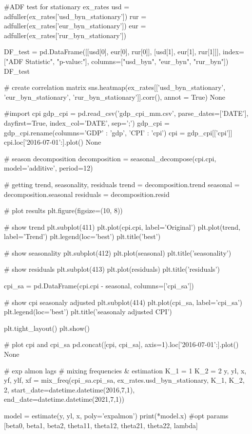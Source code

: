 \documentclass[a4paper, 12pt]{extarticle}
\begin{document}
\begin{python}
	#ADF test for stationary ex_rates
	usd = adfuller(ex_rates['usd_byn_stationary'])
	rur = adfuller(ex_rates['eur_byn_stationary'])
	eur = adfuller(ex_rates['rur_byn_stationary'])
	
	DF_test = pd.DataFrame([[usd[0], eur[0], rur[0]], [usd[1], eur[1], rur[1]]], index=["ADF Statistic", "p-value:"], columns=["usd_byn", "eur_byn", "rur_byn"])
	DF_test
		
	# create correlation matrix
	sns.heatmap(ex_rates[['usd_byn_stationary', 'eur_byn_stationary', 'rur_byn_stationary']].corr(), annot = True)
	None
	
	#import cpi
	gdp_cpi = pd.read_csv('gdp_cpi_mm.csv', parse_dates=['DATE'], dayfirst=True, index_col='DATE', sep=';')
	gdp_cpi = gdp_cpi.rename(columns={'GDP' : 'gdp', 'CPI' : 'cpi'})
	cpi = gdp_cpi[['cpi']]
	cpi.loc['2016-07-01':].plot()
	None
	
	# season decomposition
	decomposition = seasonal_decompose(cpi.cpi, model='additive', period=12)
	
	# getting trend, seasonality, residuals
	trend = decomposition.trend
	seasonal = decomposition.seasonal
	residuals = decomposition.resid
	
	# plot results
	plt.figure(figsize=(10, 8))
	
	# show trend
	plt.subplot(411)
	plt.plot(cpi.cpi, label='Original')
	plt.plot(trend, label='Trend')
	plt.legend(loc='best')
	plt.title('best')
	
	# show seasonality
	plt.subplot(412)
	plt.plot(seasonal)
	plt.title('seasonality')
	
	# show residuals
	plt.subplot(413)
	plt.plot(residuals)
	plt.title('residuals')
	
	cpi_sa = pd.DataFrame(cpi.cpi - seasonal, columns=['cpi_sa'])
	
	# show cpi seasonaly adjusted
	plt.subplot(414)
	plt.plot(cpi_sa, label='cpi_sa')
	plt.legend(loc='best')
	plt.title('seasonaly adjusted CPI')
	
	plt.tight_layout()
	plt.show()
	
	# plot cpi and cpi_sa
	pd.concat([cpi, cpi_sa], axis=1).loc['2016-07-01':].plot()
	None
		
		# exp almon lags
		# mixing frequencies & estimation
		K_1 = 1
		K_2 = 2
		y, yl, x, yf, ylf, xf = mix_freq(cpi_sa.cpi_sa, ex_rates.usd_byn_stationary, K_1, K_2, 2,
		start_date=datetime.datetime(2016,7,1),
		end_date=datetime.datetime(2021,7,1))
		
		model = estimate(y, yl, x, poly='expalmon')
		print(*model.x)
		#opt params [beta0, beta1, beta2, theta11, theta12, theta21, theta22, lambda]
		

\end{python}
\end{document}
